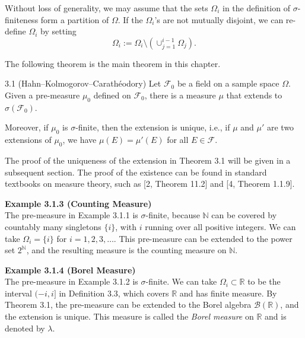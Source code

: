 Without loss of generality, we may assume that the sets $\Omega_i$ in the definition of $\sigma$-finiteness form a partition of $\Omega$. If the $\Omega_i$'s are not mutually disjoint, we can re-define $\Omega_i$ by setting
\[
\Omega_i := \Omega_i \setminus (\cup_{j=1}^{i-1} \Omega_j).
\]

The following theorem is the main theorem in this chapter.

\begin{thmbox}{3.1 (Hahn--Kolmogorov--Carathéodory)}
Let $\mathcal{F}_0$ be a field on a sample space $\Omega$. Given a pre-measure $\mu_0$ defined on $\mathcal{F}_0$, there is a measure $\mu$ that extends to $\sigma(\mathcal{F}_0)$.

Moreover, if $\mu_0$ is $\sigma$-finite, then the extension is unique, i.e., if $\mu$ and $\mu'$ are two extensions of $\mu_0$, we have $\mu(E) = \mu'(E)$ for all $E \in \mathcal{F}$.
\end{thmbox}

The proof of the uniqueness of the extension in Theorem 3.1 will be given in a subsequent section. The proof of the existence can be found in standard textbooks on measure theory, such as [2, Theorem 11.2] and [4, Theorem 1.1.9].

\textbf{Example 3.1.3 (Counting Measure)} \\
The pre-measure in Example 3.1.1 is $\sigma$-finite, because $\mathbb{N}$ can be covered by countably many singletons $\{i\}$, with $i$ running over all positive integers. We can take $\Omega_i = \{i\}$ for $i = 1, 2, 3, \dots$. This pre-measure can be extended to the power set $2^{\mathbb{N}}$, and the resulting measure is the counting measure on $\mathbb{N}$.

\textbf{Example 3.1.4 (Borel Measure)} \\
The pre-measure in Example 3.1.2 is $\sigma$-finite. We can take $\Omega_i \subset \mathbb{R}$ to be the interval $(-i, i]$ in Definition 3.3, which covers $\mathbb{R}$ and has finite measure. By Theorem 3.1, the pre-measure can be extended to the Borel algebra $\mathcal{B}(\mathbb{R})$, and the extension is unique. This measure is called the \textit{Borel measure} on $\mathbb{R}$ and is denoted by $\lambda$.